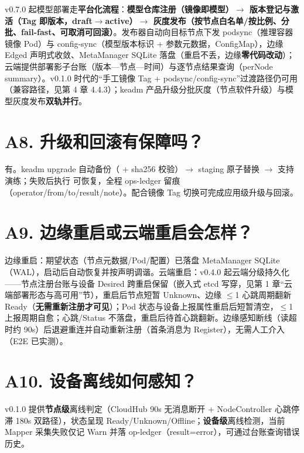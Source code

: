 v0.7.0 起模型部署走\textbf{平台化流程}：\textbf{模型仓库注册（镜像即模型）$\rightarrow$ 版本登记与激活（Tag 即版本，draft$\rightarrow$active）$\rightarrow$ 灰度发布（按节点白名单/按比例、分批、fail-fast、可取消可回滚）}。发布器自动向目标节点下发 podsync（推理容器镜像 Pod）与 config-sync（模型版本标识 + 参数元数据，ConfigMap），边缘 Edged 声明式收敛、MetaManager SQLite 落盘（重启不丢，边缘\textbf{零代码改动}）；云端提供部署影子台账（版本—节点—时间）与逐节点结果查询（perNode summary）。v0.1.0 时代的“手工镜像 Tag + podsync/config-sync”过渡路径仍可用（兼容路径，见第 4 章 4.4.3）；keadm 产品升级分批灰度（节点软件升级）与模型灰度发布\textbf{双轨并行}。

\section*{A8. 升级和回滚有保障吗？}

有。keadm upgrade 自动备份（ + sha256 校验）$\rightarrow$ staging 原子替换 $\rightarrow$ 支持  演练；失败后执行  可恢复，全程 ops-ledger 留痕（operator/from/to/result/note）。配合镜像 Tag 切换可完成应用级升级与回滚。

\section*{A9. 边缘重启或云端重启会怎样？}

边缘重启：期望状态（节点元数据/Pod/配置）已落盘 MetaManager SQLite（WAL），启动后自动恢复并按声明调谐。云端重启：v0.4.0 起云端分级持久化——节点注册台账与设备 Desired 跨重启保留（嵌入式 etcd 写穿，见第 1 章“云端部署形态与高可用”节），重启后节点短暂 Unknown、边缘 $\leq$1 心跳周期翻新 Ready（\textbf{无需重新注册才可见}）；Pod 状态与设备上报属性重启后短暂清空，$\leq$1 上报周期自愈；心跳/Status 不落盘，重启后待首心跳翻新。边缘感知断线（读超时约 90s）后退避重连并自动重新注册（首条消息为 Register），无需人工介入（E2E 已实测）。

\section*{A10. 设备离线如何感知？}

v0.1.0 提供\textbf{节点级}离线判定（CloudHub 90s 无消息断开 + NodeController 心跳停滞 180s 双路径），状态呈现 Ready/Unknown/Offline；\textbf{设备级}离线检测\warn，当前 Mapper 采集失败仅记 Warn 并落 op-ledger（result=error），可通过台账查询错误历史。

